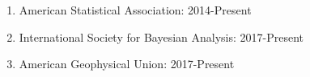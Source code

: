 \documentclass[12pt]{article}
\newcommand{\head}[1]{ %
    \bigskip %
    \begin{large}\begin{bf}{#1}\end{bf}\end{large} %

    \ \\ [-1.3cm] %

    \hrulefill}
\begin{document}
\begin{enumerate}[label=$\bullet$]
\item American Statistical Association: 2014-Present
\item International Society for Bayesian Analysis: 2017-Present
\item American Geophysical Union: 2017-Present
\end{enumerate}



\end{document}
